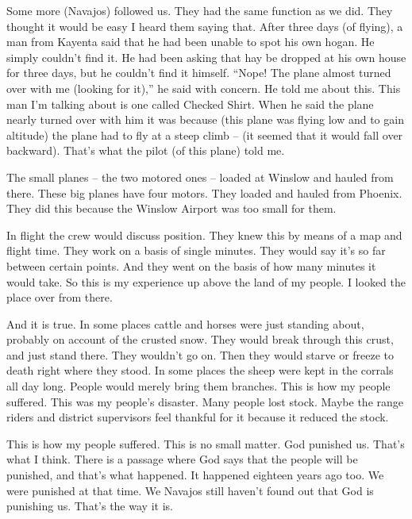 Some more (Navajos) followed us. They had the same function as we did. They thought it would be easy I heard them saying that. After three days (of flying), a man from Kayenta said that he had been unable to spot his own hogan. He simply couldn't find it. He had been asking that hay be dropped at his own house for three days, but he couldn't find it himself. ``Nope! The plane almost turned over with me (looking for it),'' he said with concern. He told me about this. This man I'm talking about is one called Checked Shirt. When he said the plane nearly turned over with him it was because (this plane was flying low and to gain altitude) the plane had to fly at a steep climb -- (it seemed that it would fall over backward). That's what the pilot (of this plane) told me.

The small planes -- the two motored ones -- loaded at Winslow and hauled from there. These big planes have four motors. They loaded and hauled from Phoenix. They did this because the Winslow Airport was too small for them.

In flight the crew would discuss position. They knew this by means of a map and flight time. They work on a basis of single minutes. They would say it's so far between certain points. And they went on the basis of how many minutes it would take. So this is my experience up above the land of my people. I looked the place over from there.

And it is true. In some places cattle and horses were just standing about, probably on account of the crusted snow. They would break through this crust, and just stand there. They wouldn't go on. Then they would starve or freeze to death right where they stood. In some places the sheep were kept in the corrals all day long. People would merely bring them branches. This is how my people suffered. This was my people's disaster. Many people lost stock. Maybe the range riders and district supervisors feel thankful for it because it reduced the stock.

This is how my people suffered. This is no small matter. God punished us. That's what I think. There is a passage where God says that the people will be punished, and that's what happened. It happened eighteen years ago too. We were punished at that time. We Navajos still haven't found out that God is punishing us. That's the way it is.